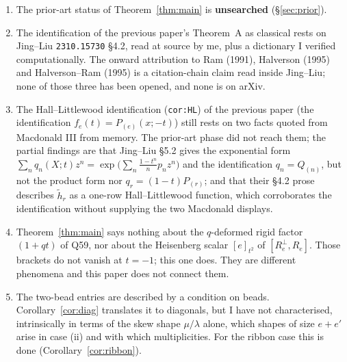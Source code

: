 \documentclass[11pt]{article}
\theoremstyle{definition}
\begin{document}
\begin{enumerate}
\item The prior-art status of Theorem~\ref{thm:main} is \textbf{unsearched} (\S\ref{sec:prior}).
\item The identification of the previous paper's Theorem~A as classical rests on Jing--Liu
\texttt{2310.15730} \S4.2, read at source by me, plus a dictionary I verified computationally.
The onward attribution to Ram (1991), Halverson (1995) and Halverson--Ram (1995) is a
citation-chain claim read inside Jing--Liu; none of those three has been opened, and none is on
arXiv.
\item The Hall--Littlewood identification (\texttt{cor:HL}) of the previous paper (the identification $f_e(t)=P_{(e)}(x;-t)$)
still rests on two facts quoted from Macdonald III from memory. The prior-art phase did not reach
them; the partial findings are that Jing--Liu \S5.2 gives the exponential form
$\sum_nq_n(X;t)z^n=\exp\bigl(\sum_n\frac{1-t^n}{n}p_nz^n\bigr)$ and the identification
$q_n=Q_{(n)}$, but not the product form nor $q_r=(1-t)P_{(r)}$; and that their \S4.2 prose
describes $\tilde h_r$ as a one-row Hall--Littlewood function, which corroborates the
identification without supplying the two Macdonald displays.
\item Theorem~\ref{thm:main} says nothing about the $q$-deformed rigid factor $(1+qt)$ of Q59,
nor about the Heisenberg scalar $[e]_{t^2}$ of $[R_e^\perp,R_e]$. Those brackets do not vanish at
$t=-1$; this one does. They are different phenomena and this paper does not connect them.
\item The two-bead entries are described by a condition on beads. Corollary~\ref{cor:diag}
translates it to diagonals, but I have not characterised, intrinsically in terms of the skew shape
$\mu/\lambda$ alone, which shapes of size $e+e'$ arise in case (ii) and with which multiplicities.
For the ribbon case this is done (Corollary~\ref{cor:ribbon}).
\end{enumerate}
\end{document}

